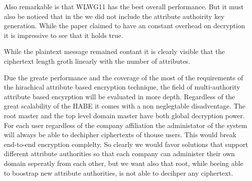 Also remarkable is that WLWG11 has the best overall performance. But it must also be noticed that in the we did not include the attribute authoirity key generation. While the paper claimed to have an constant overhead on decryption it is impressive to see that it holds true. 

While the plaintext message remained contant it is clearly visible that the ciphertext length groth linearly with the number of attributes. 

Due the greate performance and the coverage of the most of the requirements of the hirachical attribute based encryption technique, the field of multi-authority attribute based encyrption will be evaluated in more depth. Regardless of the great scalability of the \ac{HABE} it comes with a non neglegtable disadventage. The root master and the top level domain master have both global decryption power. For each user regardless of the company affiliation the administator of the system will always be able to dechipher ciphertexts of thouse users. This would break end-to-end encryption complelty. So clearly we would favor solutions that support different attribute authorities so that each company can administer their own domain seperatly from each other, but we want also that root, while beeing able to boostrap new attribute authorities, is not able to decihper any ciphertext. 


